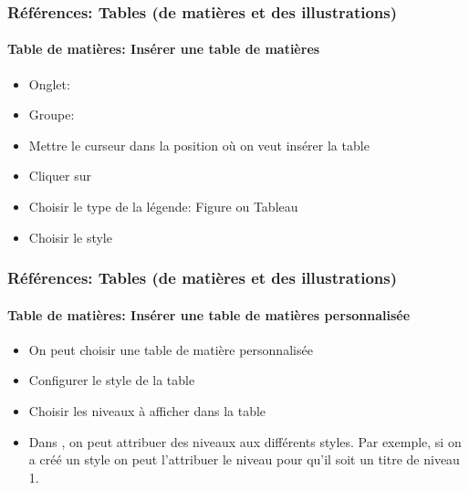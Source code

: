 \documentclass[xcolor=table]{beamer}
\begin{document}
\begin{frame}
\frametitle{Références: Tables (de matières et des illustrations)}
\framesubtitle{Table de matières: Insérer une table de matières}

\begin{minipage}{0.59\textwidth}
	\begin{itemize}
		\item Onglet: 
		\item Groupe: 
		\item Mettre le curseur dans la position où on veut insérer la table
		\item Cliquer sur 
		\item Choisir le type de la légende: Figure ou Tableau
		\item Choisir le style
	\end{itemize}
\end{minipage}
\begin{minipage}{0.40\textwidth}
\end{minipage}

\end{frame}

\begin{frame}
\frametitle{Références: Tables (de matières et des illustrations)}
\framesubtitle{Table de matières: Insérer une table de matières personnalisée}

\begin{minipage}{0.59\textwidth}
	\begin{itemize}
		\item On peut choisir une table de matière personnalisée
		\item Configurer le style de la table 
		\item Choisir les niveaux à afficher dans la table
		\item Dans , on peut attribuer des niveaux aux différents styles. 
		Par exemple, si on a créé un style  on peut l'attribuer le niveau  pour qu'il soit un titre de niveau 1.
	\end{itemize}
\end{minipage}
\begin{minipage}{0.40\textwidth}
	
\end{minipage}

\end{frame}
\end{document}
